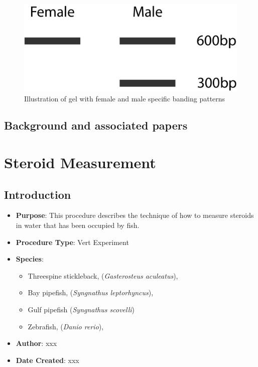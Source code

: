 \documentclass[
  letterpaper,
  DIV=11,
  numbers=noendperiod]{scrreprt}
\providecommand{\tightlist}{%
  \setlength{\itemsep}{0pt}\setlength{\parskip}{0pt}}\usepackage{longtable,booktabs,array}
\begin{document}
\begin{figure}

{\centering \includegraphics{05_Vertebrate_Experiment/../images/Sex_determ_gel_stickle.png}

}

\caption{Illustration of gel with female and male specific banding
patterns}

\end{figure}

\hypertarget{background-and-associated-papers}{%
\section{Background and associated
papers}\label{background-and-associated-papers}}

\hypertarget{sec-vert_exp-steroid_measure}{%
\chapter{Steroid Measurement}\label{sec-vert_exp-steroid_measure}}

\hypertarget{introduction-84}{%
\section{Introduction}\label{introduction-84}}

\begin{itemize}
\tightlist
\item
  \textbf{Purpose}: This procedure describes the technique of how to
  measure steroids in water that has been occupied by fish.
\item
  \textbf{Procedure Type}: Vert Experiment
\item
  \textbf{Species}:

  \begin{itemize}
  \tightlist
  \item
    Threespine stickleback, (\emph{Gasterosteus aculeatus}),
  \item
    Bay pipefish, (\emph{Syngnathus leptorhyncus}),
  \item
    Gulf pipefish (\emph{Syngnathus scovelli})
  \item
    Zebrafish, (\emph{Danio rerio}),
  \end{itemize}
\item
  \textbf{Author}: xxx
\item
  \textbf{Date Created}: xxx
\end{itemize}
\end{document}
